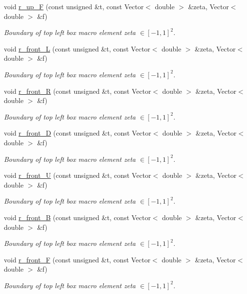 \begin{DoxyCompactItemize}
void \hyperlink{classoomph_1_1EighthSphereDomain_a9e419235f4800eab872523bdbfe72fb6}{r\+\_\+up\+\_\+F} (const unsigned \&t, const Vector$<$ double $>$ \&zeta, Vector$<$ double $>$ \&f)
\begin{DoxyCompactList}\small\item\em Boundary of top left box macro element zeta $ \in [-1,1]^2 $. \end{DoxyCompactList}\item 
void \hyperlink{classoomph_1_1EighthSphereDomain_a161d1ad8c0e991e9228a0725d7c9ccd9}{r\+\_\+front\+\_\+L} (const unsigned \&t, const Vector$<$ double $>$ \&zeta, Vector$<$ double $>$ \&f)
\begin{DoxyCompactList}\small\item\em Boundary of top left box macro element zeta $ \in [-1,1]^2 $. \end{DoxyCompactList}\item 
void \hyperlink{classoomph_1_1EighthSphereDomain_a5d32fe51e8ca993b12f911593ad46ca7}{r\+\_\+front\+\_\+R} (const unsigned \&t, const Vector$<$ double $>$ \&zeta, Vector$<$ double $>$ \&f)
\begin{DoxyCompactList}\small\item\em Boundary of top left box macro element zeta $ \in [-1,1]^2 $. \end{DoxyCompactList}\item 
void \hyperlink{classoomph_1_1EighthSphereDomain_a46ccabe44dd16cae048c302d5cfe26ee}{r\+\_\+front\+\_\+D} (const unsigned \&t, const Vector$<$ double $>$ \&zeta, Vector$<$ double $>$ \&f)
\begin{DoxyCompactList}\small\item\em Boundary of top left box macro element zeta $ \in [-1,1]^2 $. \end{DoxyCompactList}\item 
void \hyperlink{classoomph_1_1EighthSphereDomain_aef12fa8f21592009e8ab51d88c301388}{r\+\_\+front\+\_\+U} (const unsigned \&t, const Vector$<$ double $>$ \&zeta, Vector$<$ double $>$ \&f)
\begin{DoxyCompactList}\small\item\em Boundary of top left box macro element zeta $ \in [-1,1]^2 $. \end{DoxyCompactList}\item 
void \hyperlink{classoomph_1_1EighthSphereDomain_aa62bb16a2963530246c8cc9ef905c944}{r\+\_\+front\+\_\+B} (const unsigned \&t, const Vector$<$ double $>$ \&zeta, Vector$<$ double $>$ \&f)
\begin{DoxyCompactList}\small\item\em Boundary of top left box macro element zeta $ \in [-1,1]^2 $. \end{DoxyCompactList}\item 
void \hyperlink{classoomph_1_1EighthSphereDomain_a71d48567ee2661821f41dd50793a6eb1}{r\+\_\+front\+\_\+F} (const unsigned \&t, const Vector$<$ double $>$ \&zeta, Vector$<$ double $>$ \&f)
\begin{DoxyCompactList}\small\item\em Boundary of top left box macro element zeta $ \in [-1,1]^2 $. \end{DoxyCompactList}\end{DoxyCompactItemize}
